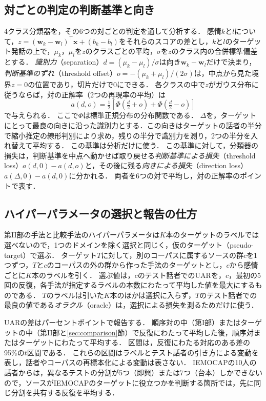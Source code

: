 \subsection{対ごとの判定の判断基準と向き}
\label{sec:setting-model}

4クラス分類器を，その6つの対ごとの判定を通して分析する．
感情$k$と$l$について，$z = (\mathbf{w}_k - \mathbf{w}_l)^{\top}\mathbf{x} + (b_k - b_l)$をそれらのスコアの差とし，$k$と$l$のターゲット発話の上で，$\mu_k$，$\mu_l$を$z$のクラスごとの平均，$\sigma$を$z$のクラス内の合併標準偏差とする．
\emph{識別力}（separation）$d = (\mu_k - \mu_l)/\sigma$は向き$\mathbf{w}_k - \mathbf{w}_l$だけで決まり，\emph{判断基準のずれ}（threshold offset）$o = -(\mu_k + \mu_l)/(2\sigma)$は，中点から見た境界$z=0$の位置であり，切片だけで0にできる．
各クラスの中で$z$がガウス分布に従うならば，対の正解率（2つの再現率の平均）は
\begin{equation}
\label{eq:twocloud}
a(d, o) = \tfrac{1}{2}\left[\Phi\!\left(\tfrac{d}{2} + o\right) + \Phi\!\left(\tfrac{d}{2} - o\right)\right]
\end{equation}
で与えられる．
ここで$\Phi$は標準正規分布の分布関数である．
$\Delta$を，ターゲットにとって最良の向きに沿った識別力とする．この向きはターゲットの話者の半分で縮小推定の線形判別により求め，残りの半分で識別力を測り，2つの半分を入れ替えて平均する．
この基準は分析だけに使う．
この基準に対して，分類器の損失は，判断基準を中点へ動かせば取り戻せる\emph{判断基準による損失}（threshold loss）$a(d, 0) - a(d, o)$と，その後に残る\emph{向きによる損失}（direction loss）$a(\Delta, 0) - a(d, 0)$に分かれる．
両者を6つの対で平均し，対の正解率のポイントで表す．

\subsection{ハイパーパラメータの選択と報告の仕方}
\label{sec:setting-selection}

第II部の手法と比較手法のハイパーパラメータは$K$本のターゲットのラベルでは選べないので，1つのドメインを除く選択\cite{gulrajani2021domainbed}と同じく，仮のターゲット（pseudo-target）で選ぶ．
ターゲット$T$に対して，別のコーパスに属するソースの群$c$を1つずつ，$T$と$c$のコーパスの外の群から作った手法のターゲットとし，$c$から感情ごとに$K$本のラベルを引く．
選ぶ値は，$c$のテスト話者でのUARを，$c$，最初の5回の反復，各手法が指定するラベルの本数にわたって平均した値を最大にするものである．
$T$のラベルは引いた$K$本のほかは選択に入らず，$T$のテスト話者での最良の値である\emph{オラクル}（oracle）は，選択による損失を測るためだけに使う．

UARの差はパーセントポイントで報告する．
順序対の中（第I部）またはターゲットの中（第II部と\ref{sec:comparison}節）で反復にわたって平均した後，順序対またはターゲットにわたって平均する．
区間は，反復にわたる対応のある差の95\%の$t$区間である．
これらの区間はラベルとテスト話者の引き方による変動を表し，話者やコーパスの再標本化による変動は表さない．
IEMOCAPの10人の話者からは，異なるテストの分割が5つ（即興）または7つ（台本）しかできないので，ソースがIEMOCAPのターゲットに役立つかを判断する箇所では，先に同じ分割を共有する反復を平均する．
